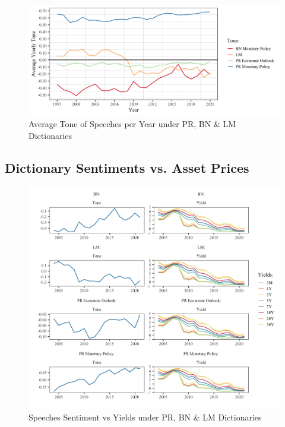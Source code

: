 \begin{figure}[H]
    \centering
    \includegraphics[width =\textwidth]{figures/tones.png}
    \vspace{-3mm}
    \caption{Average Tone of Speeches per Year under PR, BN \& LM Dictionaries}
    \label{fig:avgtones} 
\end{figure}

\subsection{Dictionary Sentiments vs. Asset Prices}

\begin{figure}[H]
    \includegraphics[width = \textwidth]{figures/tonesyields.png}
    \vspace{-9mm}
    \caption{Speeches Sentiment vs Yields under PR, BN \& LM Dictionaries}
    \label{fig:sentyields}  
\end{figure}


